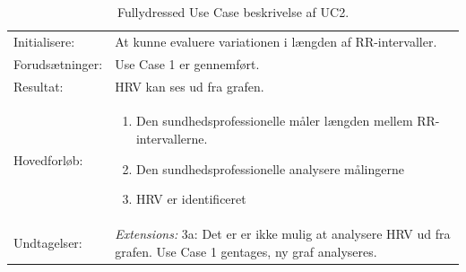 \begin{table}[H]
\begin{tabularx}{\textwidth}{l X}
     Initialisere:          & 	At kunne evaluere variationen i længden af RR-intervaller.
		 \\ \addlinespace[1mm]                                                                                                                                                                                                                                                                                                             
     Forudsætninger:        & 	Use Case 1 er gennemført.                                                                                                                                                                                                                                                                                                                                                                                                                                                                                                                                                                           \\ \addlinespace[1mm]                                                                                                                                                       
     Resultat:              & 	HRV kan ses ud fra grafen.                                                                                                                                                                                                                                                                                                                                                                                                                                                                                                                          \\ \midrule \addlinespace[1mm]                                                                                                                                                       
     Hovedforløb:           &  \begin{enumerate}
     						   \item Den sundhedsprofessionelle måler længden mellem RR-intervallerne.
     						   \item Den sundhedsprofessionelle analysere målingerne
     						   \item HRV er identificeret
\newline						[Extensions 3a: HRV er ikke identificerbart]
     						   \end{enumerate}
\\ \midrule 
 	Undtagelser:           & \textit{Extensions:}
\newline					 3a: Det er er ikke mulig at analysere HRV ud fra grafen. Use Case 1 gentages, ny graf analyseres.
\\ \bottomrule
    \end{tabularx}
    \caption {Fullydressed Use Case beskrivelse af UC2.}
    \label{tab:UC2}
\end{table}

